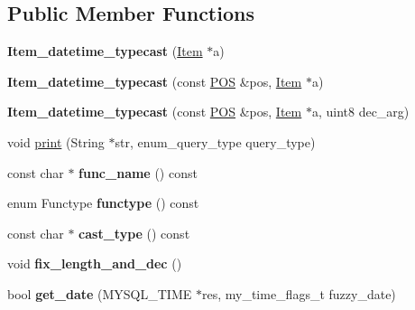 \subsection*{Public Member Functions}
\begin{DoxyCompactItemize}
\item 
\mbox{\label{classItem__datetime__typecast_a9b48cd315790f17db19a5c8e2acf21ed}} 
{\bfseries Item\+\_\+datetime\+\_\+typecast} (\mbox{\hyperlink{classItem}{Item}} $\ast$a)
\item 
\mbox{\label{classItem__datetime__typecast_a42c278e5d6a6b85ff457aaaf734c2dc8}} 
{\bfseries Item\+\_\+datetime\+\_\+typecast} (const \mbox{\hyperlink{structYYLTYPE}{P\+OS}} \&pos, \mbox{\hyperlink{classItem}{Item}} $\ast$a)
\item 
\mbox{\label{classItem__datetime__typecast_af2c6c05f8d0b5ad5560b0b9a3ec1b9b9}} 
{\bfseries Item\+\_\+datetime\+\_\+typecast} (const \mbox{\hyperlink{structYYLTYPE}{P\+OS}} \&pos, \mbox{\hyperlink{classItem}{Item}} $\ast$a, uint8 dec\+\_\+arg)
\item 
void \mbox{\hyperlink{classItem__datetime__typecast_a0b5814efb8176acce656e2f7d4ad9185}{print}} (String $\ast$str, enum\+\_\+query\+\_\+type query\+\_\+type)
\item 
\mbox{\label{classItem__datetime__typecast_af80e4c114bf72e4d8e9db553998f31ec}} 
const char $\ast$ {\bfseries func\+\_\+name} () const
\item 
\mbox{\label{classItem__datetime__typecast_a82a538ab31c55a313d5a3bebd221f24a}} 
enum Functype {\bfseries functype} () const
\item 
\mbox{\label{classItem__datetime__typecast_abb06c96db7d50ce967cd46d96e5bb32a}} 
const char $\ast$ {\bfseries cast\+\_\+type} () const
\item 
\mbox{\label{classItem__datetime__typecast_a17ef4950d62c0d0e83cce636ae6f8775}} 
void {\bfseries fix\+\_\+length\+\_\+and\+\_\+dec} ()
\item 
\mbox{\label{classItem__datetime__typecast_aec96ee92238d7bc5f8ea88dfabd24a07}} 
bool {\bfseries get\+\_\+date} (M\+Y\+S\+Q\+L\+\_\+\+T\+I\+ME $\ast$res, my\+\_\+time\+\_\+flags\+\_\+t fuzzy\+\_\+date)
\end{DoxyCompactItemize}
